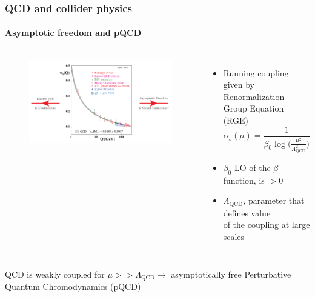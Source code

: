 \documentclass[aspectratio=43]{beamer}
\begin{document}
\begin{frame}

	\frametitle{QCD and collider physics}
	\framesubtitle{Asymptotic freedom and pQCD}
	
	\begin{columns}	
		
		
		\begin{figure}
			\includegraphics[width = 6 cm]{plots/part1/chapter1/qcd_running_fit.png}
		\end{figure}
		
		
		\begin{itemize}
			\item \footnotesize Running coupling given by Renormalization Group Equation (RGE)
			\begin{equation}
			\alpha_{s}(\mu) = \frac{1}{\beta_{0} \log\big( \frac{\mu^{2}}{\Lambda_{\textrm{QCD}}^{2}}\big)} \nonumber
			\end{equation}
			\item \footnotesize $\beta_{0}$ LO of the $\beta$ function, is $ > 0$
			\item \footnotesize $\Lambda_{\textrm{QCD}}$, parameter that defines value \\ of the coupling at large scales
		\end{itemize}
		
	\end{columns}
	
	\vspace{1cm}
	\center \footnotesize QCD is weakly coupled for $\mu >> \Lambda_{\textrm{QCD}} \longrightarrow$ asymptotically free
	\center \footnotesize \color{red} Perturbative Quantum Chromodynamics (pQCD)

\end{frame}
\end{document}

